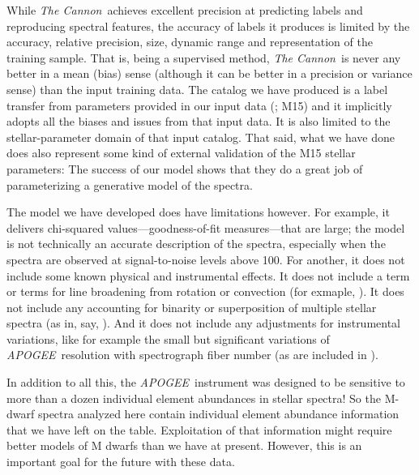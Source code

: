 \documentclass[twocolumn]{aastex62}
\newcommand{\apogee}{\textsl{APOGEE}}
\newcommand{\thecannon}{\textsl{The Cannon}}
\begin{document}
While \thecannon\ achieves excellent precision at predicting labels
and reproducing spectral features, the
accuracy of labels it produces is limited by
the accuracy, relative precision, size, dynamic range and
representation of the training sample.
That is, being a supervised method, \thecannon\ is never any better in a mean (bias) sense
(although it can be better in a precision or variance sense) than the input training
data.
The catalog we have produced is a label transfer from parameters provided
in our input data (\citealt{Mann:2015}; M15) and it implicitly adopts all the biases and
issues from that input data.
It is also limited to the stellar-parameter domain of that input catalog.
That said, what we have done does also represent some kind of external validation of the M15
stellar parameters:
The success of our model shows that they do a great job of parameterizing a generative
model of the spectra.

The model we have developed does have limitations however.
For example, it delivers chi-squared values---goodness-of-fit measures---that
are large; the model is not technically an accurate description of the spectra,
especially when the spectra are observed at signal-to-noise levels above 100.
For another, it does not include some known physical and instrumental effects.
It does not include a term or terms for line broadening from rotation or
convection (for exmaple, \citealt{Behmard2019}).
It does not include any accounting for binarity or superposition of multiple
stellar spectra (as in, say, \citealt{ElBadry:2018}).
And it does not include any adjustments for instrumental variations, like for
example the small but significant variations of \apogee\ resolution with
spectrograph fiber number (as are included in \citealt{Ness2018}).

In addition to all this, the \apogee\ instrument was designed to be sensitive to more than
a dozen individual element abundances in stellar spectra!
So the M-dwarf spectra analyzed here contain individual element abundance
information that we have left on the table.
Exploitation of that information might require better models of M dwarfs than
we have at present.
However, this is an important goal for the future with these data.
\end{document}
